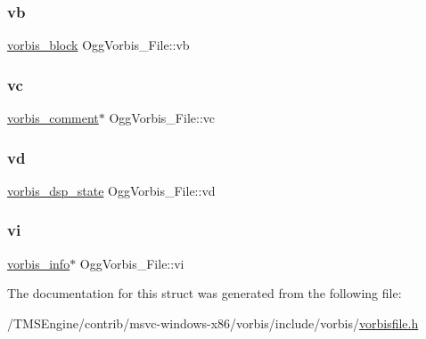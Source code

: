 \subsubsection{\texorpdfstring{vb}{vb}}
{\footnotesize\ttfamily \hyperlink{structvorbis__block}{vorbis\+\_\+block} Ogg\+Vorbis\+\_\+\+File\+::vb}

\mbox{\label{struct_ogg_vorbis___file_a4467850c72aed93fe0a70e8f1fd6f20e}} 
\subsubsection{\texorpdfstring{vc}{vc}}
{\footnotesize\ttfamily \hyperlink{structvorbis__comment}{vorbis\+\_\+comment}$\ast$ Ogg\+Vorbis\+\_\+\+File\+::vc}

\mbox{\label{struct_ogg_vorbis___file_acb9d38719f54642d1a39f24203b466d6}} 
\subsubsection{\texorpdfstring{vd}{vd}}
{\footnotesize\ttfamily \hyperlink{structvorbis__dsp__state}{vorbis\+\_\+dsp\+\_\+state} Ogg\+Vorbis\+\_\+\+File\+::vd}

\mbox{\label{struct_ogg_vorbis___file_aa5586b939d7c31c8eec83cf1380b45a6}} 
\subsubsection{\texorpdfstring{vi}{vi}}
{\footnotesize\ttfamily \hyperlink{structvorbis__info}{vorbis\+\_\+info}$\ast$ Ogg\+Vorbis\+\_\+\+File\+::vi}



The documentation for this struct was generated from the following file\+:\begin{DoxyCompactItemize}
\item 
/\+T\+M\+S\+Engine/contrib/msvc-\/windows-\/x86/vorbis/include/vorbis/\hyperlink{vorbisfile_8h}{vorbisfile.\+h}\end{DoxyCompactItemize}

